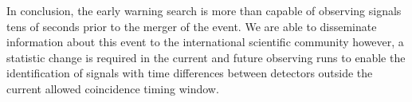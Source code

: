 In conclusion, the early warning search is more than capable of observing \gwadj signals tens of seconds prior to the merger of the \gwadj event. We are able to disseminate information about this event to the international scientific community however, a statistic change is required in the current and future observing runs to enable the identification of \gwadj signals with time differences between detectors outside the current allowed coincidence timing window.






